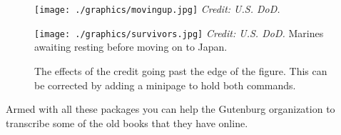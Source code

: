 \providecommand\addcredit[1]{%
 \vspace*{-6.5pt}
 \scriptsize%
 \flushright%
 \textit{Credit: #1}%
}

\begin{figure}[htp]
\centering

\captionsetup{name=Photo., labelsep=period}%
   \begin{minipage}[t]{0.48\textwidth}
      \texttt{[image: ./graphics/movingup.jpg]}%
      \addcredit{U.S. DoD.}%
     \caption{The effects of the credit going past the edge of the figure. This can be corrected by adding a minipage to hold both commands. }
\end{minipage}\hfill\hfill
\begin{minipage}[t]{0.48\textwidth}
      \texttt{[image: ./graphics/survivors.jpg]}%
      \addcredit{U.S. DoD.}%
    {\footnotesize Marines awaiting resting before moving on to Japan. }
\end{minipage}

\end{figure}
\newpage


Armed with all these packages you can help the Gutenburg organization to transcribe
some of the old books that they have online. 

\clearpage








